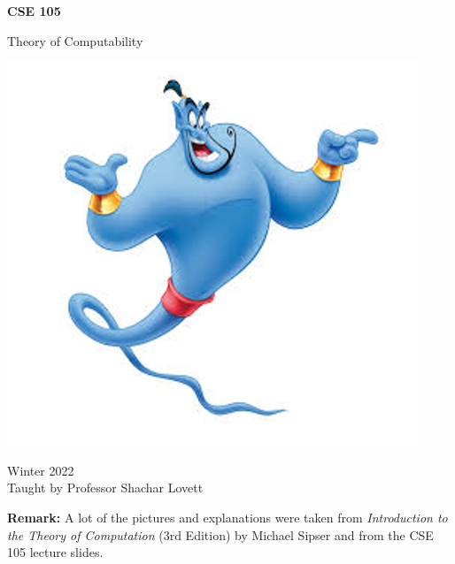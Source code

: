 \documentclass[letterpaper]{article}
\begin{document}
\begin{titlepage}
    \begin{center}
        \vspace*{1cm}
            
        \Huge
        \textbf{CSE 105}
            
        \vspace{0.5cm}
        \LARGE
        Theory of Computability
            
        \vspace{1.5cm}
        
        \begin{center}
            \includegraphics[]{assets/genie.png}
        \end{center}
        \vfill
            
        Winter 2022 \\
        Taught by Professor Shachar Lovett
    \end{center}
\end{titlepage}


\newpage 

\begingroup
    \renewcommand\contentsname{Table of Contents}
    \tableofcontents
\endgroup

\bigskip 

\textbf{Remark:} A lot of the pictures and explanations were taken from \emph{Introduction to the Theory of Computation} (3rd Edition) by Michael Sipser and from the CSE 105 lecture slides. 
\end{document}
